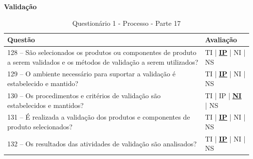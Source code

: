 \documentclass[openany,10pt,a4paper]{article}
\begin{document}
\begin{appendix}
	\begin{table}[h]
	\textbf{Validação}
		\centering
		\caption{Questionário 1 - Processo - Parte 17}
		\begin{tabular}{p{5in}p{1in}}		
			\toprule
			\textbf{Questão}  & \textbf{Avaliação}\\ 
			\midrule
			128 – São selecionados os produtos ou componentes de produto a serem validados e os 
	métodos de validação a serem utilizados?
	 & TI | \underline{\textbf{IP}} | NI | NS \\
			\midrule
			129 – O ambiente necessário para suportar a validação é estabelecido e mantido?
	 & TI | \underline{\textbf{IP}} | NI | NS \\
			\midrule
			130 – Os procedimentos e critérios de validação são estabelecidos e mantidos?
	 & TI | IP | \underline{\textbf{NI}} | NS \\
			\midrule
			131 – É realizada a validação dos produtos e componentes de produto selecionados?
	 & TI | \underline{\textbf{IP}} | NI | NS \\
			\midrule
			132 – Os resultados das atividades de validação são analisados?
	  & TI | \underline{\textbf{IP}} | NI | NS \\
			\bottomrule
		\end{tabular} 
	\end{table}
	

\end{appendix}
\end{document}
